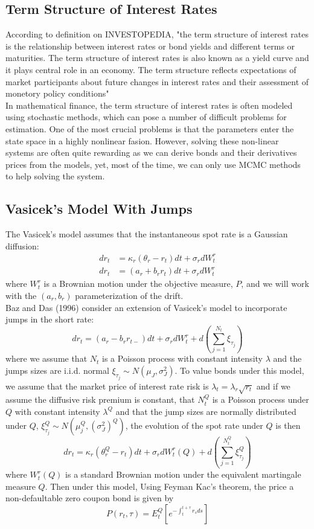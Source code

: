 

\subsection{Term Structure of Interest Rates}
According to definition on INVESTOPEDIA, "the term structure of interest rates is the relationship between interest rates or bond yields and different terms or maturities. The term structure of interest rates is also known as a yield curve and it plays central role in an economy. The term structure reflects expectations of market participants about future changes in interest rates and their assessment of monetory policy conditions"\\
In mathematical finance, the term structure of interest rates is often modeled using stochastic methods, which can pose a number of difficult problems for estimation. One of the most crucial problems is that the parameters enter the state space in a highly nonlinear fasion. However, solving these non-linear systems are often quite rewarding as we can derive bonds and their derivatives prices from the models, yet, most of the time, we can only use MCMC methods to help solving the system.
\subsection{Vasicek's Model With Jumps}
The Vasicek's model assumes that the instantaneous spot rate is a Gaussian diffusion:
\begin{align*}
  dr_t &= \kappa_r(\theta_r-r_t)dt+\sigma_rdW_t^r\\
  dr_t &= (a_r+b_r r_t)dt+\sigma_rdW_t^r
\end{align*}
where $W_t^r$ is a Brownian motion under the objective measure, $P$, and we will work with the $(a_r,b_r)$ parameterization of the drift. \\
Baz and Das (1996) consider an extension of Vasicek's model to incorporate jumps in the short rate:
$$dr_t=(a_r-b_rr_{t-})dt +\sigma_r dW_t^r + d\left(\sum\limits_{j=1}^{N_t}\xi_{\tau_j}\right)$$
where we assume that $N_t$ is a Poisson process with constant intensity $\lambda$ and the jumps sizes are i.i.d. normal $\xi_{\tau_j}\sim N(\mu_J,\sigma_J^2)$. To value bonds under this model, we assume that the market price of interest rate risk is $\lambda_t=\lambda_r\sqrt{r_t}$  and if we assume the diffusive risk premium is constant, that $N_t^Q$ is a Poisson process under $Q$ with constant intensity $\lambda^Q$ and that the jump sizes are normally distributed under $Q$, $\xi_{\tau_j}^Q\sim N\left(\mu_j^Q,(\sigma_J^2)^Q\right)$, the evolution of the spot rate under $Q$ is then
$$dr_t = \kappa_r(\theta_r^Q-r_t)dt+\sigma_rdW_t^r(Q)+d\left(\sum\limits_{j=1}^{N_t^Q}\xi_{\tau_j}^Q\right)$$
where $W_t^r(Q)$ is a standard Brownian motion under the equivalent martingale measure $Q$. Then under this model, Using Feyman Kac's theorem, the price a non-defaultable zero coupon bond is given by
$$P(r_t,\tau)=E_t^Q\left[e^{-\int_t^{t+\tau}r_sds}\right]$$
